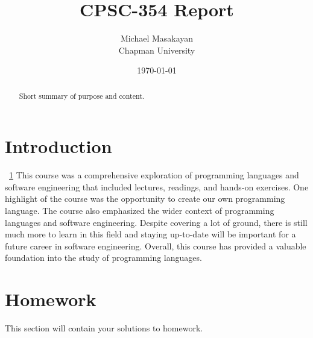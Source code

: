 \documentclass{article}
\title{CPSC-354 Report}
\author{Michael Masakayan  \\ Chapman University}
\date{\today}
\theoremstyle{theorem}
\theoremstyle{definition}
\theoremstyle{remark}
\begin{document}
\maketitle

\begin{abstract}
Short  summary of purpose and content.  
\end{abstract}
\tableofcontents


\section{Introduction}\label{intro}

~\ref{intro} This course was a comprehensive exploration of programming languages and software engineering that included lectures, readings, and hands-on exercises. One highlight of the course was the opportunity to create our own programming language. The course also emphasized the wider context of programming languages and software engineering. Despite covering a lot of ground, there is still much more to learn in this field and staying up-to-date will be important for a future career in software engineering. Overall, this course has provided a valuable foundation into the study of programming languages.


\section{Homework}\label{homework}

This section will contain your solutions to homework. 
\end{document}
